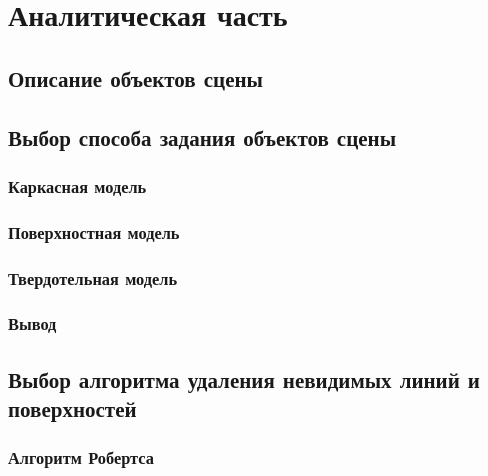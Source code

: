 \section{Аналитическая часть}





\subsection{Описание объектов сцены}

\subsection{Выбор способа задания объектов сцены}

\subsubsection{Каркасная модель}

\subsubsection{Поверхностная модель}

\subsubsection{Твердотельная модель}

\subsubsection*{Вывод}

\subsection{Выбор алгоритма удаления невидимых линий и поверхностей}

\subsubsection{Алгоритм Робертса}

